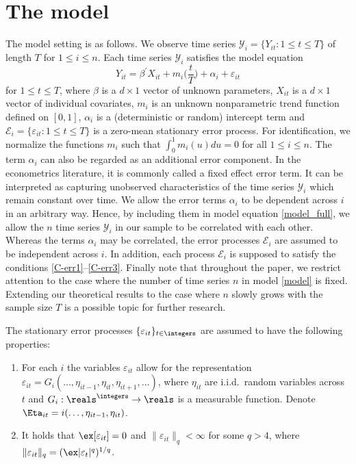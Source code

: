 
\section{The model}\label{sec-model}

The model setting is as follows. We observe time series $\mathcal{Y}_i = \{Y_{it}: 1 \le t \le T \}$ of length $T$ for $1 \le i \le n$. Each time series $\mathcal{Y}_i$ satisfies the model equation \begin{equation}\label{model_full}
Y_{it} = \beta^\prime X_{it} + m_i \Big( \frac{t}{T} \Big) + \alpha_i + \varepsilon_{it} 
\end{equation}
for $1 \le t \le T$, where $\beta$ is a $d \times 1$ vector of unknown parameters, $X_{it}$ is a $d\times 1$ vector of individual covariates, $m_i$ is an unknown nonparametric trend function defined on $[0,1]$, $\alpha_i$ is a (deterministic or random) intercept term and $\mathcal{E}_i = \{ \varepsilon_{it}: 1 \le t \le T \}$ is a zero-mean stationary error process. For identification, we normalize the functions $m_i$ such that $\int_0^1 m_i(u) du = 0$ for all $1 \le i \le n$. The term $\alpha_i$ can also be regarded as an additional error component. In the econometrics literature, it is commonly called a fixed effect error term. It can be interpreted as capturing unobserved characteristics of the time series $\mathcal{Y}_i$ which remain constant over time. We allow the error terms $\alpha_i$ to be dependent across $i$ in an arbitrary way. Hence, by including them in model equation \eqref{model_full}, we allow the $n$ time series $\mathcal{Y}_i$ in our sample to be correlated with each other. Whereas the terms $\alpha_i$ may be correlated, the error processes $\mathcal{E}_i$ are assumed to be independent across $i$. In addition, each process $\mathcal{E}_i$ is supposed to satisfy the conditions \ref{C-err1}--\ref{C-err3}. Finally note that throughout the paper, we restrict attention to the case where the number of time series $n$ in model \eqref{model} is fixed. Extending our theoretical results to the case where $n$ slowly grows with the sample size $T$ is a possible topic for further research.

The stationary error processes $\{\varepsilon_{it}\}_{t\in\integers}$ are assumed to have the following properties: 
\begin{enumerate}[label=(C\arabic*),leftmargin=1.05cm]

\item \label{C-err1} For each $i$ the variables $\varepsilon_{it}$ allow for the representation $\varepsilon_{it} = G_i(\ldots,\eta_{it-1},\eta_{it},\eta_{it+1},\ldots)$, where $\eta_{it}$ are i.i.d.\ random variables across $t$ and $G_i: \reals^\integers \rightarrow \reals$ is a measurable function. Denote $\Eta_{it} = i(\ldots,\eta_{it-1},\eta_{it})$.

\item \label{C-err2} It holds that $\ex[\varepsilon_{it}] =0$ and $\| \varepsilon_{it} \|_q < \infty$ for some $q > 4$, where $\| \varepsilon_{it} \|_q = (\ex|\varepsilon_t|^q)^{1/q}$. 

\end{enumerate}

